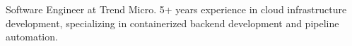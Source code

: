 \par{
  Software Engineer at Trend Micro. 5+ years experience in cloud infrastructure development, specializing in containerized backend development and pipeline automation.
}
